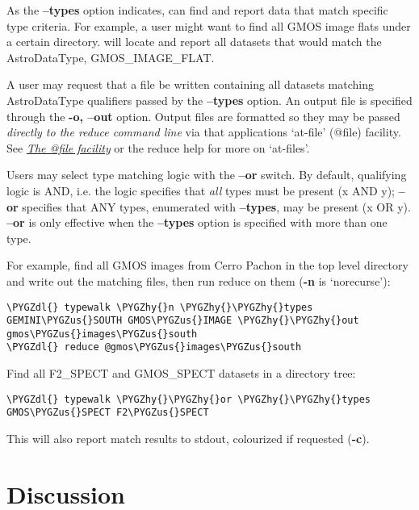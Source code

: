 \documentclass[letterpaper,10pt,english]{sphinxmanual}
\def\PYGZus{\char`\_}
\def\PYGZdl{\char`\$}
\def\PYGZhy{\char`\-}
\begin{document}
As the \textbf{--types} option indicates,  can find and report data that
match specific type criteria. For example, a user might want to find all GMOS
image flats under a certain directory.  will locate and report all
datasets that would match the AstroDataType, GMOS\_IMAGE\_FLAT.

A user may request that a file be written containing all datasets
matching AstroDataType qualifiers passed by the \textbf{--types} option. An output
file is specified through the \textbf{-o, --out} option. Output files are formatted
so they may be passed \emph{directly to the reduce command line} via that applications
`at-file' (@file) facility. See {\hyperref[interfaces:atfile]{\emph{The @file facility}}} or the reduce help for more on
`at-files'.

Users may select type matching logic with the \textbf{--or} switch. By default,
qualifying logic is AND, i.e. the logic specifies that \emph{all} types must be
present (x AND y); \textbf{--or} specifies that ANY types, enumerated with
\textbf{--types}, may be present (x OR y). \textbf{--or} is only effective when the
\textbf{--types} option is specified with more than one type.

For example, find all GMOS images from Cerro Pachon in the top level
directory and write out the matching files, then run reduce on them
(\textbf{-n} is `norecurse'):

\begin{Verbatim}[commandchars=\\\{\}]
\PYGZdl{} typewalk \PYGZhy{}n \PYGZhy{}\PYGZhy{}types GEMINI\PYGZus{}SOUTH GMOS\PYGZus{}IMAGE \PYGZhy{}\PYGZhy{}out gmos\PYGZus{}images\PYGZus{}south
\PYGZdl{} reduce @gmos\PYGZus{}images\PYGZus{}south
\end{Verbatim}

Find all F2\_SPECT and GMOS\_SPECT datasets in a directory tree:

\begin{Verbatim}[commandchars=\\\{\}]
\PYGZdl{} typewalk \PYGZhy{}\PYGZhy{}or \PYGZhy{}\PYGZhy{}types GMOS\PYGZus{}SPECT F2\PYGZus{}SPECT
\end{Verbatim}

This will also report match results to stdout, colourized if requested (\textbf{-c}).


\chapter{Discussion}
\label{discuss:discussion}\label{discuss::doc}
\end{document}
